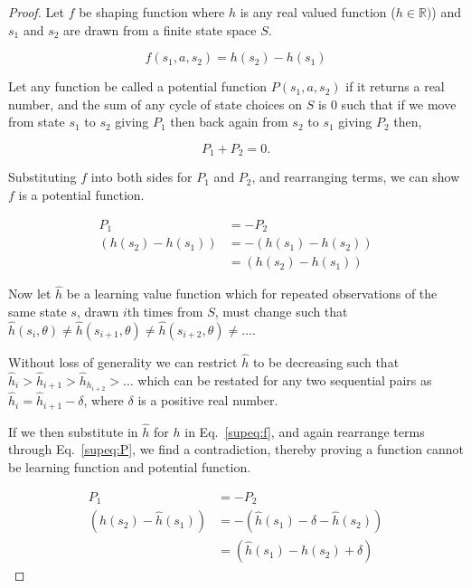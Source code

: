 \documentclass[9pt,lineno]{elife}
\begin{document}
\begin{proof}
Let $f$ be shaping function where $h$ is any real valued function ($h \in \mathbb{R})$) and $s_1$ and $s_2$ are drawn from a finite state space $S$.

\begin{equation}
\label{supeq:f}
f(s_1,a,s_2) = h(s_2) - h(s_1)    
\end{equation}

Let any function be called a potential function $P(s_1,a,s_2)$ if it returns a real number, and the sum of any cycle of state choices on $S$ is 0 such that if we move from state $s_1$ to $s_2$ giving $P_1$ then back again from $s_2$ to $s_1$ giving $P_2$ then,

\begin{equation}
\label{supeq:P}
P_1 + P_2 = 0.
\end{equation}

Substituting $f$ into both sides for $P_1$ and $P_2$, and rearranging terms, we can show $f$ is a potential function.

\begin{align*}
    P_1               &= -P_2\\
    (h(s_2) - h(s_1)) &= -(h(s_1) - h(s_2))\\
                      &= (h(s_2) - h(s_1))
\end{align*}

Now let $\hat h$ be a learning value function which for repeated observations of the same state $s$, drawn $i$th times from $S$, must change such that $\hat h(s_i, \theta) \neq \hat h(s_{i+1}, \theta) \neq \hat h(s_{i+2}, \theta) \neq \ldots$. 

Without loss of generality we can restrict $\hat h$ to be decreasing such that $\hat h_i > \hat h_{i+1} > \hat h_h_{i+2} > \ldots$ which can be restated for any two sequential pairs as $\hat h_i = \hat h_{i+1} - \delta$, where $\delta$ is a positive real number.

If we then substitute in $\hat h$ for $h$ in Eq.~\ref{supeq:f}, and again rearrange terms through Eq.~\ref{supeq:P}, we find a contradiction, thereby proving a function cannot be learning function and potential function. 

\begin{align*}
    P_1                         &= -P_2\\
    (\hat h(s_2) - \hat h(s_1)) &= -(\hat h(s_1) - \delta - \hat h(s_2))\\
                                &= (\hat h(s_1) - \hat h(s_2) + \delta)
\end{align*}
\end{proof}
\end{document}
